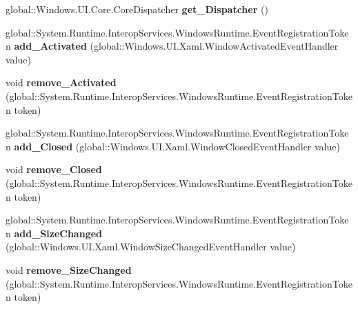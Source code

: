 \begin{DoxyCompactItemize}
global\+::\+Windows.\+U\+I.\+Core.\+Core\+Dispatcher {\bfseries get\+\_\+\+Dispatcher} ()
\item 
\mbox{\label{class_windows_1_1_u_i_1_1_xaml_1_1_window_a9c86b88ed3cf1a52a88a638b75e01fa7}} 
global\+::\+System.\+Runtime.\+Interop\+Services.\+Windows\+Runtime.\+Event\+Registration\+Token {\bfseries add\+\_\+\+Activated} (global\+::\+Windows.\+U\+I.\+Xaml.\+Window\+Activated\+Event\+Handler value)
\item 
\mbox{\label{class_windows_1_1_u_i_1_1_xaml_1_1_window_a3d1b79b4484e987c7e8e39d71b41c7f6}} 
void {\bfseries remove\+\_\+\+Activated} (global\+::\+System.\+Runtime.\+Interop\+Services.\+Windows\+Runtime.\+Event\+Registration\+Token token)
\item 
\mbox{\label{class_windows_1_1_u_i_1_1_xaml_1_1_window_adb7cdb439992e4bd48b89f73f5654c16}} 
global\+::\+System.\+Runtime.\+Interop\+Services.\+Windows\+Runtime.\+Event\+Registration\+Token {\bfseries add\+\_\+\+Closed} (global\+::\+Windows.\+U\+I.\+Xaml.\+Window\+Closed\+Event\+Handler value)
\item 
\mbox{\label{class_windows_1_1_u_i_1_1_xaml_1_1_window_af4dfd22097abcbe56cc5002bf87ef515}} 
void {\bfseries remove\+\_\+\+Closed} (global\+::\+System.\+Runtime.\+Interop\+Services.\+Windows\+Runtime.\+Event\+Registration\+Token token)
\item 
\mbox{\label{class_windows_1_1_u_i_1_1_xaml_1_1_window_a883a42ba036296bce22db4dd54a0e00b}} 
global\+::\+System.\+Runtime.\+Interop\+Services.\+Windows\+Runtime.\+Event\+Registration\+Token {\bfseries add\+\_\+\+Size\+Changed} (global\+::\+Windows.\+U\+I.\+Xaml.\+Window\+Size\+Changed\+Event\+Handler value)
\item 
\mbox{\label{class_windows_1_1_u_i_1_1_xaml_1_1_window_a5241aefc4f3d8ef6c34cb6aeaef63884}} 
void {\bfseries remove\+\_\+\+Size\+Changed} (global\+::\+System.\+Runtime.\+Interop\+Services.\+Windows\+Runtime.\+Event\+Registration\+Token token)
\item 
\mbox{\label{class_windows_1_1_u_i_1_1_xaml_1_1_window_afb2f2c85c54f1a082f2cdb9cac5b875c}} 

\end{DoxyCompactItemize}
